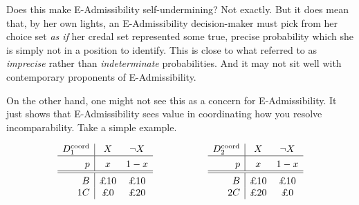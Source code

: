 \documentclass[a4paper]{article}
\newcommand\Tstrut{\rule{0pt}{2.6ex}}       %
\newcommand\Bstrut{\rule[-0.9ex]{0pt}{0pt}} %
\newcommand\EU{\mathrm{EU}}
\newcommand{\IB}{\mathbb{B}}
\renewcommand{\color}[1]{}
\newenvironment{CCM rewritten}
{\begingroup\color{blue}} %
{\endgroup}              %
\begin{document}


Does this make E-Admissibility self-undermining? Not exactly. But it does mean that, by her own lights, an E-Admissibility decision-maker must pick from her choice set \emph{as if} her credal set represented some true, precise probability which she is simply not in a position to identify. This is close to what \cite{levi99} referred to as \emph{imprecise} rather than \emph{indeterminate} probabilities. And it may not sit well with contemporary proponents of E-Admissibility.



	
	
	On the other hand, one might not see this as a concern for E-Admissibility. %
It just shows that E-Admissibility sees value in coordinating how you resolve incomparability.
Take a simple example.
	
	\label{eg:coord}
	$$
	\begin{array}{r|cc}
		D^{\mathrm{coord}}_1 & X & \neg X  \Bstrut \\\hline \Tstrut		p & x & 1-x \Bstrut \\\hline \hline\Tstrut 
		B & \text{\pounds 10} & \text{\pounds 10}   \\
		1C & \text{\pounds 0} & \text{\pounds 20} 
	\end{array}\hspace{20mm}
	\begin{array}{r|cc}
		D^{\mathrm{coord}}_2 & X & \neg X  \Bstrut \\\hline \Tstrut		p & x & 1-x \Bstrut \\\hline \hline\Tstrut 
		B & \text{\pounds 10} & \text{\pounds 10}   \\
		2C & \text{\pounds 20} & \text{\pounds 0} 
	\end{array}
	$$
	
\end{document}
